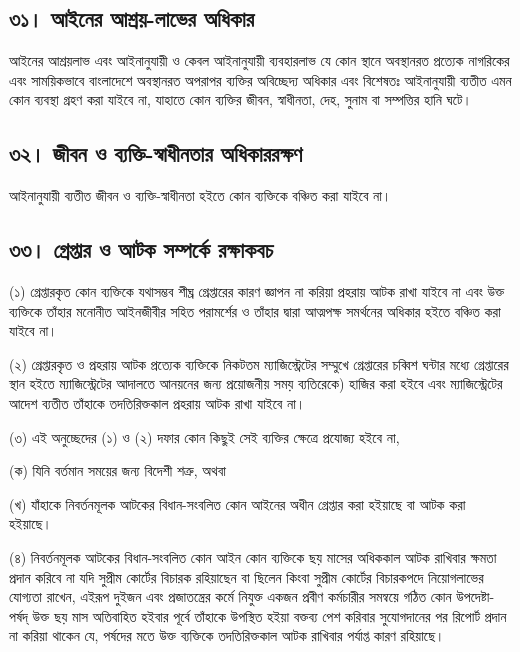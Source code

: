 \documentclass[11pt]{article}
\begin{document}
\subsection{৩১। আইনের আশ্রয়-লাভের অধিকার}
\label{sec:org1ae36bd}
আইনের আশ্রয়লাভ এবং আইনানুযায়ী ও কেবল আইনানুযায়ী ব্যবহারলাভ যে কোন স্থানে
অবস্থানরত প্রত্যেক নাগরিকের এবং সাময়িকভাবে বাংলাদেশে অবস্থানরত অপরাপর
ব্যক্তির অবিচ্ছেদ্য অধিকার এবং বিশেষতঃ আইনানুযায়ী ব্যতীত এমন কোন ব্যবস্থা
গ্রহণ করা যাইবে না, যাহাতে কোন ব্যক্তির জীবন, স্বাধীনতা, দেহ, সুনাম বা
সম্পত্তির হানি ঘটে।

\subsection{৩২। জীবন ও ব্যক্তি-স্বাধীনতার অধিকাররক্ষণ}
\label{sec:org01859a4}
আইনানুযায়ী ব্যতীত জীবন ও ব্যক্তি-স্বাধীনতা হইতে কোন ব্যক্তিকে বঞ্চিত করা যাইবে না।

\subsection{৩৩। গ্রেপ্তার ও আটক সম্পর্কে রক্ষাকবচ}
\label{sec:orge62b46c}
(১) গ্রেপ্তারকৃত কোন ব্যক্তিকে যথাসম্ভব শীঘ্র গ্রেপ্তারের কারণ জ্ঞাপন না করিয়া
    প্রহরায় আটক রাখা যাইবে না এবং উক্ত ব্যক্তিকে তাঁহার মনোনীত আইনজীবীর সহিত
    পরামর্শের ও তাঁহার দ্বারা আত্মপক্ষ সমর্থনের অধিকার হইতে বঞ্চিত করা যাইবে না।

(২) গ্রেপ্তারকৃত ও প্রহরায় আটক প্রত্যেক ব্যক্তিকে নিকটতম ম্যাজিস্ট্রেটের সম্মুখে
    গ্রেপ্তারের চব্বিশ ঘন্টার মধ্যে গ্রেপ্তারের স্থান হইতে ম্যাজিস্ট্রেটের আদালতে
    আনয়নের জন্য প্রয়োজনীয় সময় ব্যতিরেকে) হাজির করা হইবে এবং ম্যাজিস্ট্রেটের আদেশ
    ব্যতীত তাঁহাকে তদতিরিক্তকাল প্রহরায় আটক রাখা যাইবে না।

(৩) এই অনুচ্ছেদের (১) ও (২) দফার কোন কিছুই সেই ব্যক্তির ক্ষেত্রে প্রযোজ্য হইবে
    না,

(ক) যিনি বর্তমান সময়ের জন্য বিদেশী শত্রু, অথবা

(খ) যাঁহাকে নিবর্তনমূলক আটকের বিধান-সংবলিত কোন আইনের অধীন গ্রেপ্তার করা
    হইয়াছে বা আটক করা হইয়াছে।

(৪) নিবর্তনমূলক আটকের বিধান-সংবলিত কোন আইন কোন ব্যক্তিকে ছয় মাসের অধিককাল
    আটক রাখিবার ক্ষমতা প্রদান করিবে না যদি সুপ্রীম কোর্টের বিচারক রহিয়াছেন বা
    ছিলেন কিংবা সুপ্রীম কোর্টের বিচারকপদে নিয়োগলাভের যোগ্যতা রাখেন, এইরূপ দুইজন
    এবং প্রজাতন্ত্রের কর্মে নিযুক্ত একজন প্রবীণ কর্মচারীর সমন্বয়ে গঠিত কোন
    উপদেষ্টা-পর্ষদ্ উক্ত ছয় মাস অতিবাহিত হইবার পূর্বে তাঁহাকে উপস্থিত হইয়া বক্তব্য
    পেশ করিবার সুযোগদানের পর রিপোর্ট প্রদান না করিয়া থাকেন যে, পর্ষদের মতে উক্ত
    ব্যক্তিকে তদতিরিক্তকাল আটক রাখিবার পর্যাপ্ত কারণ রহিয়াছে।
\end{document}
